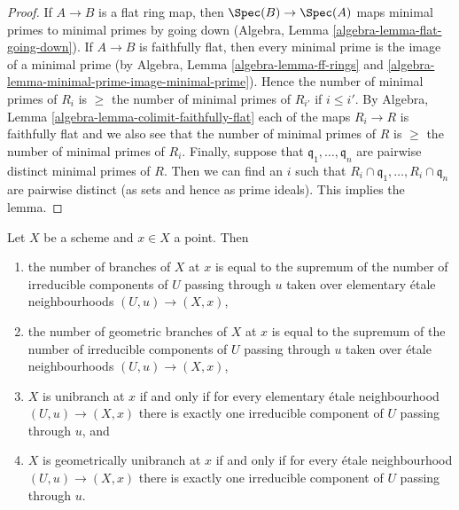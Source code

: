 \begin{proof}
If $A \to B$ is a flat ring map, then $\Spec(B) \to \Spec(A)$
maps minimal primes to minimal primes by going down
(Algebra, Lemma \ref{algebra-lemma-flat-going-down}).
If $A \to B$ is faithfully flat, then every minimal
prime is the image of a minimal prime (by
Algebra, Lemma \ref{algebra-lemma-ff-rings} and
\ref{algebra-lemma-minimal-prime-image-minimal-prime}).
Hence the number of minimal primes of $R_i$ is
$\geq$ the number of minimal primes of $R_{i'}$ if $i \leq i'$.
By Algebra, Lemma \ref{algebra-lemma-colimit-faithfully-flat}
each of the maps $R_i \to R$ is
faithfully flat and we also see that
the number of minimal primes of $R$ is
$\geq$ the number of minimal primes of $R_i$.
Finally, suppose that $\mathfrak q_1, \ldots, \mathfrak q_n$
are pairwise distinct minimal primes of $R$. Then we can
find an $i$ such that $R_i \cap \mathfrak q_1, \ldots, R_i \cap \mathfrak q_n$
are pairwise distinct (as sets and hence as prime ideals).
This implies the lemma.
\end{proof}

\begin{lemma}
\label{lemma-nr-branches}
Let $X$ be a scheme and $x \in X$ a point. Then
\begin{enumerate}
\item the number of branches of $X$ at $x$ is equal to
the supremum of the number of irreducible components of $U$
passing through $u$ taken over elementary \'etale neighbourhoods
$(U, u) \to (X, x)$,
\item the number of geometric branches of $X$ at $x$ is equal to
the supremum of the number of irreducible components of $U$
passing through $u$ taken over \'etale neighbourhoods
$(U, u) \to (X, x)$,
\item $X$ is unibranch at $x$ if and only if for every
elementary \'etale neighbourhood $(U, u) \to (X, x)$ there
is exactly one irreducible component of $U$ passing through $u$, and
\item $X$ is geometrically unibranch at $x$ if and only if for every
\'etale neighbourhood $(U, u) \to (X, x)$ there
is exactly one irreducible component of $U$ passing through $u$.
\end{enumerate}
\end{lemma}

